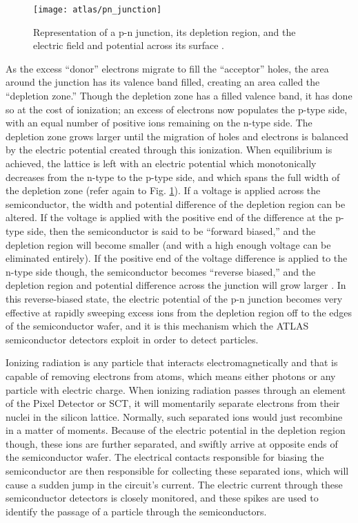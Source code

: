         \begin{figure}
            \texttt{[image: atlas/pn\_junction]}
            \caption{Representation of a p-n junction, its depletion region,
                and the electric field and potential across its surface \cite{Havránek:2317324}.}
            \label{fig:pn_junction}
        \end{figure}

        As the excess ``donor'' electrons migrate to fill the ``acceptor'' holes, the area around the junction has its valence band filled, creating an area called the ``depletion zone.''
        Though the depletion zone has a filled valence band, it has done so at the cost of ionization; an excess of electrons now populates the p-type side, with an equal number of positive ions remaining on the n-type side.
        The depletion zone grows larger until the migration of holes and electrons is balanced by the electric potential created through this ionization.
        When equilibrium is achieved, the lattice is left with an electric potential which monotonically decreases from the n-type to the p-type side, and which spans the full width of the depletion zone (refer again to Fig. \ref{fig:pn_junction}).
        If a voltage is applied across the semiconductor, the width and potential difference of the depletion region can be altered.
        If the voltage is applied with the positive end of the difference at the p-type side, then the semiconductor is said to be ``forward biased,'' and the depletion region will become smaller (and with a high enough voltage can be eliminated entirely).
        If the positive end of the voltage difference is applied to the n-type side though, the semiconductor becomes ``reverse biased,'' and the depletion region and potential difference across the junction will grow larger \cite{wiley_radiation_detection}.
        In this reverse-biased state, the electric potential of the p-n junction becomes very effective at rapidly sweeping excess ions from the depletion region off to the edges of the semiconductor wafer, and it is this mechanism which the ATLAS semiconductor detectors exploit in order to detect particles.

        Ionizing radiation is any particle that interacts electromagnetically and that is capable of removing electrons from atoms,
            which means either photons or any particle with electric charge.
        When ionizing radiation passes through an element of the Pixel Detector or SCT, it will momentarily separate electrons from their nuclei in the silicon lattice.
        Normally, such separated ions would just recombine in a matter of moments.
        Because of the electric potential in the depletion region though, these ions are further separated, and swiftly arrive at opposite ends of the semiconductor wafer.
        The electrical contacts responsible for biasing the semiconductor are then responsible for collecting these separated ions, which will cause a sudden jump in the circuit's current.
        The electric current through these semiconductor detectors is closely monitored, and these spikes are used to identify the passage of a particle through the semiconductors.

